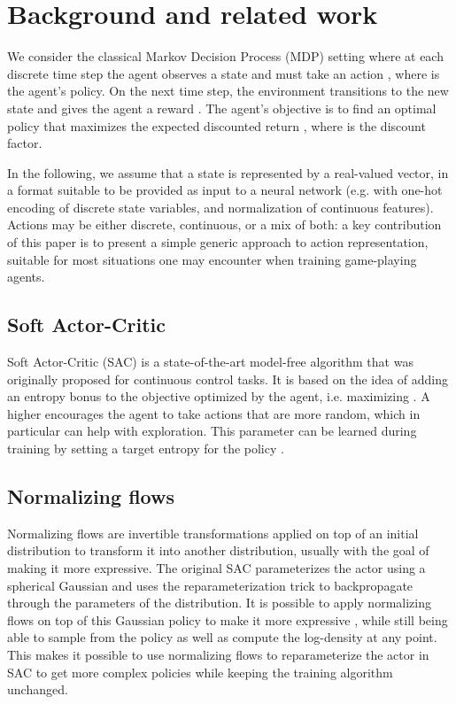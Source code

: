 \documentclass[letterpaper]{article} \usepackage{aaai20}  \usepackage{times}  \usepackage{helvet} \usepackage{courier}  \usepackage[hyphens]{url}  \usepackage{graphicx} \urlstyle{rm} \def\UrlFont{\rm}  \usepackage{graphicx}  \usepackage[section]{placeins}
\begin{document}
\section{Background and related work}

We consider the classical Markov Decision Process (MDP) setting where at each discrete time step  the agent observes a state  and must take an action , where  is the agent's policy.
On the next time step, the environment transitions to the new state  and gives the agent a reward .
The agent's objective is to find an optimal policy  that maximizes the expected discounted return , where  is the discount factor.

In the following, we assume that a state is represented by a real-valued vector, in a format suitable to be provided as input to a neural network (e.g. with one-hot encoding of discrete state variables, and normalization of continuous features).
Actions may be either discrete, continuous, or a mix of both: a key contribution of this paper is to present a simple generic approach to action representation, suitable for most situations one may encounter when training game-playing agents.

\subsection{Soft Actor-Critic}

Soft Actor-Critic (SAC) \citep{haarnoja2018soft,haarnoja2018softapplications} is a state-of-the-art model-free algorithm that was originally proposed for continuous control tasks.
It is based on the idea of adding an entropy bonus to the objective optimized by the agent, i.e. maximizing .
A higher  encourages the agent to take actions that are more random, which in particular can help with exploration. This  parameter can be learned during training by setting a target entropy for the policy \cite{haarnoja2018softapplications}.



\subsection{Normalizing flows}

Normalizing flows \cite{normalizingflows2015} are invertible transformations applied on top of an initial distribution to transform it into another distribution, usually with the goal of making it more expressive. The original SAC \cite{haarnoja2018soft} parameterizes the actor using a spherical Gaussian and uses the reparameterization trick to backpropagate through the parameters of the distribution. It is possible to apply normalizing flows on top of this Gaussian policy to make it more expressive \cite{mazoure2019leveraging}, while still being able to sample from the policy as well as compute the log-density at any point. This makes it possible to use normalizing flows to reparameterize the actor in SAC to get more complex policies while keeping the training algorithm unchanged.  
\end{document}
